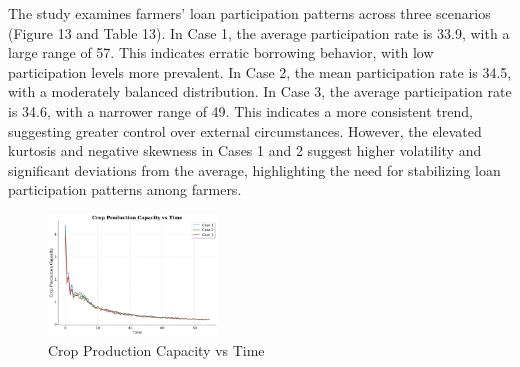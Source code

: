 \documentclass[final,5p,times,twocolumn,authoryear]{elsarticle}
\begin{document}
The study examines farmers' loan participation patterns across three scenarios (Figure 13 and Table 13). In Case 1, the average participation rate is 33.9, with a large range of 57. This indicates erratic borrowing behavior, with low participation levels more prevalent. In Case 2, the mean participation rate is 34.5, with a moderately balanced distribution. In Case 3, the average participation rate is 34.6, with a narrower range of 49. This indicates a more consistent trend, suggesting greater control over external circumstances. However, the elevated kurtosis and negative skewness in Cases 1 and 2 suggest higher volatility and significant deviations from the average, highlighting the need for stabilizing loan participation patterns among farmers.\\
\begin{figure}[htbp]
    \centering
    \includegraphics[width=0.4\textwidth]{graph_all/plots_mod/crop_production_capacity_vs_time.png}
    \caption{Crop Production Capacity vs Time}
    \label{fig:crop_production}
\end{figure}
\end{document}
